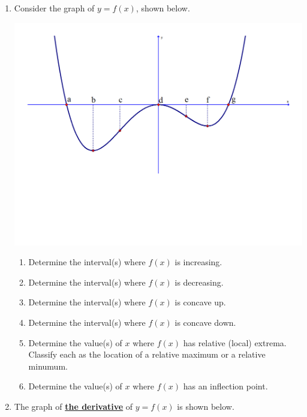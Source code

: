 \documentclass[12pt]{article}
\begin{document}
\begin{enumerate}

\item Consider the graph of $y=f(x)$, shown below.

\begin{center}
\includegraphics[scale=0.5]{graph.pdf}
\end{center}

\begin{enumerate}

\item Determine the interval(s) where $f(x)$ is increasing.

\item Determine the interval(s) where $f(x)$ is decreasing.

\item Determine the interval(s) where $f(x)$ is concave up.

\item Determine the interval(s) where $f(x)$ is concave down.

\item Determine the value(s) of $x$ where $f(x)$ has relative (local) extrema.  Classify each as the location of a relative maximum or a relative minumum.

\item Determine the value(s) of $x$ where $f(x)$ has an inflection point.

\end{enumerate}

\item The graph of \underline{\bf the derivative} of $y=f(x)$ is shown below.


\end{enumerate}
\end{document}
